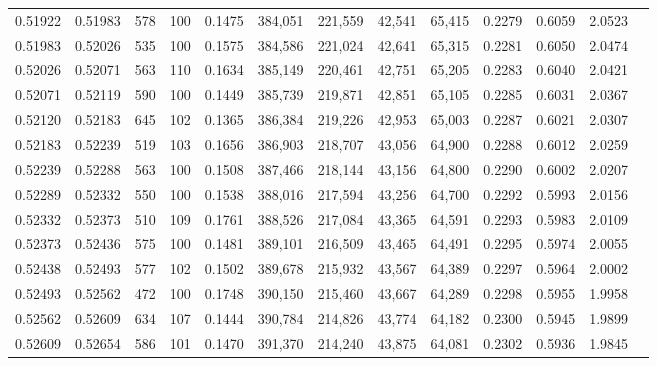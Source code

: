 \begin{tabular}{rrrrrrrrrrrrr}
0.51922 & 0.51983 &   578 & 100 &                                     0.1475 & 384,051 & 221,559 &  42,541 &  65,415 & 0.2279 & 0.6059 & 2.0523 \\
0.51983 & 0.52026 &   535 & 100 &                                     0.1575 & 384,586 & 221,024 &  42,641 &  65,315 & 0.2281 & 0.6050 & 2.0474 \\
0.52026 & 0.52071 &   563 & 110 &                                     0.1634 & 385,149 & 220,461 &  42,751 &  65,205 & 0.2283 & 0.6040 & 2.0421 \\
0.52071 & 0.52119 &   590 & 100 &                                     0.1449 & 385,739 & 219,871 &  42,851 &  65,105 & 0.2285 & 0.6031 & 2.0367 \\
0.52120 & 0.52183 &   645 & 102 &                                     0.1365 & 386,384 & 219,226 &  42,953 &  65,003 & 0.2287 & 0.6021 & 2.0307 \\
0.52183 & 0.52239 &   519 & 103 &                                     0.1656 & 386,903 & 218,707 &  43,056 &  64,900 & 0.2288 & 0.6012 & 2.0259 \\
0.52239 & 0.52288 &   563 & 100 &                                     0.1508 & 387,466 & 218,144 &  43,156 &  64,800 & 0.2290 & 0.6002 & 2.0207 \\
0.52289 & 0.52332 &   550 & 100 &                                     0.1538 & 388,016 & 217,594 &  43,256 &  64,700 & 0.2292 & 0.5993 & 2.0156 \\
0.52332 & 0.52373 &   510 & 109 &                                     0.1761 & 388,526 & 217,084 &  43,365 &  64,591 & 0.2293 & 0.5983 & 2.0109 \\
0.52373 & 0.52436 &   575 & 100 &                                     0.1481 & 389,101 & 216,509 &  43,465 &  64,491 & 0.2295 & 0.5974 & 2.0055 \\
0.52438 & 0.52493 &   577 & 102 &                                     0.1502 & 389,678 & 215,932 &  43,567 &  64,389 & 0.2297 & 0.5964 & 2.0002 \\
0.52493 & 0.52562 &   472 & 100 &                                     0.1748 & 390,150 & 215,460 &  43,667 &  64,289 & 0.2298 & 0.5955 & 1.9958 \\
0.52562 & 0.52609 &   634 & 107 &                                     0.1444 & 390,784 & 214,826 &  43,774 &  64,182 & 0.2300 & 0.5945 & 1.9899 \\
0.52609 & 0.52654 &   586 & 101 &                                     0.1470 & 391,370 & 214,240 &  43,875 &  64,081 & 0.2302 & 0.5936 & 1.9845 \\

\end{tabular}
